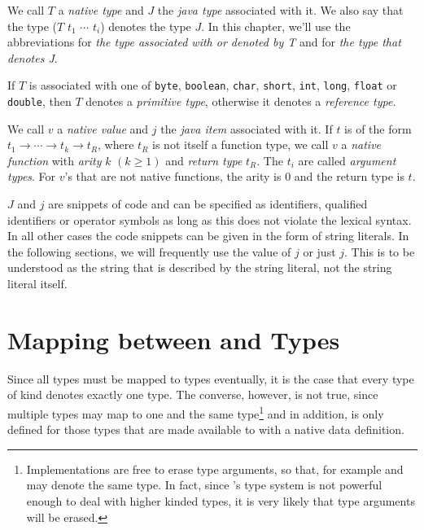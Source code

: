 We call $T$ a \emph{native type} and $J$ the \emph{java type} associated with it. 
We also say that the \frege{} type ($T$ $t_1$ $\cdots$ $t_i$) denotes the \java{} type $J$.
In this chapter, we'll use the abbreviations  for \emph{the \java{} type associated with or denoted by T}
and for \emph{the \frege{} type that denotes J}.

If $T$ is associated with one of 
\texttt{byte}, \texttt{boolean}, \texttt{char}, \texttt{short}, \texttt{int}, \texttt{long}, \texttt{float} or \texttt{double}, 
then $T$ denotes a \emph{primitive type}, otherwise it denotes a \emph{reference type}.

We call $v$ a \emph{native value} and $j$ the \emph{java item} associated with it. If $t$ is of the form $t_1 \rightarrow{} \cdots{} \rightarrow{} t_k \rightarrow{}t_R$, where $t_R$ is not itself a function type, we call $v$ a \emph{native function} with \emph{arity} $k$ $(k\ge 1)$ and \emph{return type} $t_R$. The $t_i$ are called \emph{argument types}. For $v$'s that are not native functions, the arity is 0 and the return type is $t$.

$J$ and $j$ are snippets of \java{} code and can be specified as identifiers, qualified identifiers or operator symbols as long as this does not violate the \frege{} lexical syntax. In all other cases the code snippets can be given in the form of string literals. In the following sections, we will frequently use the value of $j$ or just $j$. This is to be understood as the string that is described by the string literal, not the string literal itself.

\section{Mapping between \frege{} and \java{} Types}

Since all \frege{} types must be mapped to \java{} types eventually, 
it is the case that every \frege{} type of kind \sym{*} denotes exactly one \java{} type. 
The converse, however, is not true, since multiple \frege{} 
types may map to one and the same \java{} type\footnote{Implementations are free to erase type arguments, 
so that, for example  and  may denote the same \java{} type. 
In fact, since \java{}'s type system is not powerful enough to deal with higher kinded types, 
it is very likely that type arguments will be erased.}
and in addition,  is only defined for
those \java{} types that are made available to \frege{} with a native data definition.


